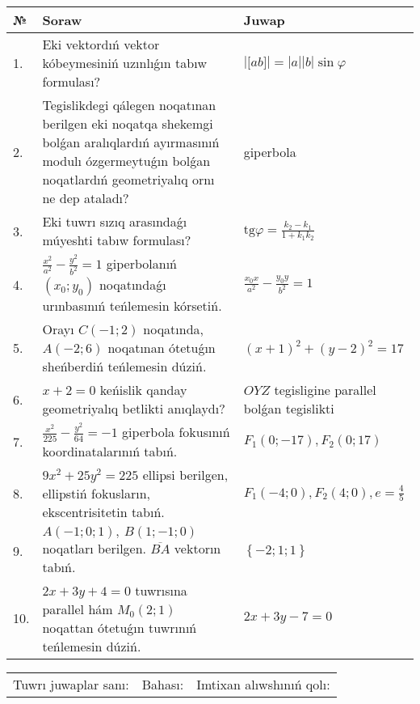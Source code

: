 \documentclass{article}
\begin{document}
\begin{tabular}{|m{0.7cm}|m{10cm}|m{4cm}|}
\hline
№ & Soraw & Juwap \\
\hline
1. & Eki vektordıń vektor kóbeymesiniń uzınlıǵın tabıw formulası? & $\left| \lbrack ab\rbrack \right|=|a||b|\sin\varphi$ \\
\hline
2. & Tegislikdegi qálegen noqatınan berilgen eki noqatqa shekemgi bolǵan aralıqlardıń ayırmasınıń modulı ózgermeytuǵın bolǵan noqatlardıń geometriyalıq ornı ne dep ataladı? & giperbola \\
\hline
3. & Eki tuwrı sızıq arasındaǵı múyeshti tabıw formulası? & $\text{tg}\varphi=\frac{k_2-k_1}{1+k_1k_2}$ \\
\hline
4. & $\frac{x^2}{a^2}-\frac{y^2}{b^2}=1$ giperbolanıń $(x_0;y_0)$ noqatındaǵı urınbasınıń teńlemesin kórsetiń. & $\frac{x_0x}{a^2}-\frac{y_0y}{b^2}=1$ \\
\hline
5. & Orayı $C (-1;2)$ noqatında, $A (-2;6 )$ noqatınan ótetuǵın sheńberdiń teńlemesin dúziń. & $(x+1)^{2}+(y-2)^{2}=17$ \\
\hline
6. & $x+2=0$ keńislik qanday geometriyalıq betlikti anıqlaydı? &  $OYZ$ tegisligine parallel bolǵan tegislikti \\
\hline
7. & $\frac{x^{2}}{225}-\frac{y^{2}}{64}=-1$ giperbola fokusınıń koordinatalarınıń tabıń. & $F_{1}(0;-17), F_{2}(0;17)$ \\
\hline
8. & $9x^{2}+25y^{2}=225$ ellipsi berilgen, ellipstiń fokusların, ekscentrisitetin tabıń. & $F_1\left(-4;0 \right) , F_2\left( 4;0 \right) , e = \frac{4}{5}$ \\
\hline
9. & $A (-1;0;1),\ B (1;-1;0)$ noqatları berilgen. $\overline{BA}$ vektorın tabıń. & $\left\{ - 2;1;1 \right\}$ \\
\hline
10. & $2x+3y+4=0$ tuwrısına parallel hám $M_{0} (2;1)$ noqattan ótetuǵın tuwrınıń teńlemesin dúziń. & $2x+3y-7=0$ \\
\hline
\end{tabular}

\vspace{1cm}

\begin{tabular}{lll}
Tuwrı juwaplar sanı: \underline{\hspace{1.5cm}} & 
Bahası: \underline{\hspace{1.5cm}} & 
Imtixan alıwshınıń qolı: \underline{\hspace{2cm}} \\
\end{tabular}
\end{document}
